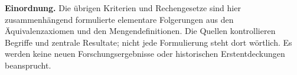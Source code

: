 \begingroup
\footnotesize
\noindent\textbf{Einordnung.}
Die übrigen Kriterien und Rechengesetze sind hier zusammenhängend
formulierte elementare Folgerungen aus den Äquivalenzaxiomen und
den Mengendefinitionen. Die Quellen kontrollieren Begriffe und
zentrale Resultate; nicht jede Formulierung steht dort wörtlich.
Es werden keine neuen Forschungsergebnisse oder historischen
Erstentdeckungen beansprucht.
\endgroup

